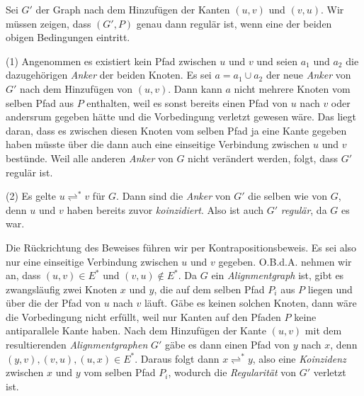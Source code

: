 \begin{beweis}
	Sei $G'$ der Graph nach dem Hinzufügen der Kanten $(u,v)$ und $(v,u)$. Wir müssen zeigen, dass $(G',P)$ genau dann regulär ist, wenn eine der beiden obigen Bedingungen eintritt.
	
	\bewhin (1) Angenommen es existiert kein Pfad zwischen $u$ und $v$ und seien $a_1$ und $a_2$ die dazugehörigen \emph{Anker} der beiden Knoten. Es sei $a = a_1 \cup a_2$ der neue \emph{Anker} von $G'$ nach dem Hinzufügen von $(u,v)$. Dann kann $a$ nicht mehrere Knoten vom selben Pfad aus $P$ enthalten, weil es sonst bereits einen Pfad von $u$ nach $v$ oder andersrum gegeben hätte und die Vorbedingung verletzt gewesen wäre. Das liegt daran, dass es zwischen diesen Knoten vom selben Pfad ja eine Kante gegeben haben müsste über die dann auch eine einseitige Verbindung zwischen $u$ und $v$ bestünde. Weil alle anderen \emph{Anker} von $G$ nicht verändert werden, folgt, dass $G'$ regulär ist.
	
	(2) Es gelte $u \rightleftharpoons^{*} v$ für $G$. Dann sind die \emph{Anker} von $G'$ die selben wie von $G$, denn $u$ und $v$ haben bereits zuvor \emph{koinzidiert}. Also ist auch $G'$ \emph{regulär}, da $G$ es war.
	
	\bewrueck Die Rückrichtung des Beweises führen wir per Kontrapositionsbeweis. Es sei also nur eine einseitige Verbindung zwischen $u$ und $v$ gegeben. O.B.d.A. nehmen wir an, dass $(u,v) \in E^{*}$ und $(v,u) \notin E^{*}$. Da $G$ ein \emph{Alignmentgraph} ist, gibt es zwangsläufig zwei Knoten $x$ und $y$, die auf dem selben Pfad $P_i$ aus $P$ liegen und über die der Pfad von $u$ nach $v$ läuft. Gäbe es keinen solchen Knoten, dann wäre die Vorbedingung nicht erfüllt, weil nur Kanten auf den Pfaden $P$ keine antiparallele Kante haben. Nach dem Hinzufügen der Kante $(u,v)$ mit dem resultierenden \emph{Alignmentgraphen} $G'$ gäbe es dann einen Pfad von $y$ nach $x$, denn $(y,v), (v,u), (u,x) \in E^{*}$. Daraus folgt dann $x \rightleftharpoons^{*} y$, also eine \emph{Koinzidenz} zwischen $x$ und $y$ vom selben Pfad $P_i$, wodurch die \emph{Regularität} von $G'$ verletzt ist.
\end{beweis}


